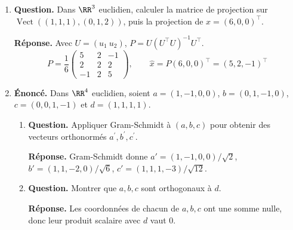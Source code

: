 \documentclass[12pt, a4paper]{article}
\begin{document}
\begin{enumerate}[label=8.\arabic*., start=70]
\begin{minipage}[t]{\linewidth}
\begin{enumerate}[\arabic*.]
  \item \textbf{Question.} Calculer la distance de $(6,0,0)^\top$ à l’espace colonne de $\begin{pmatrix}1&0\\0&1\\0&0\end{pmatrix}$, puis de $\begin{pmatrix}0&0\\1&0\\0&1\end{pmatrix}$.
\par\smallskip
\textbf{Réponse.} Pour $x=(6,0,0)^\top$, la distance au plan $z=0$ est $0$, et celle au plan $x=0$ est $6$.

\end{enumerate}
\end{minipage}

  \item \begin{minipage}[t]{\linewidth}\raggedright
\textbf{Question.} Dans $\RR^3$ euclidien, calculer la matrice de projection sur $\operatorname{Vect}((1,1,1),(0,1,2))$, puis la projection de $x=(6,0,0)^\top$.
\par\smallskip
\textbf{Réponse.} Avec $U=(u_1\ u_2)$, $P=U(U^\top U)^{-1}U^\top$.
    \[
      P=\frac16\begin{pmatrix}5&2&-1\\2&2&2\\-1&2&5\end{pmatrix},\qquad
      \widehat x=P(6,0,0)^\top=(5,2,-1)^\top
    \]
\end{minipage}

  \item \begin{minipage}[t]{\linewidth}\raggedright
\textbf{Énoncé.} Dans $\RR^4$ euclidien, soient $a=(1,-1,0,0)$, $b=(0,1,-1,0)$, $c=(0,0,1,-1)$ et $d=(1,1,1,1)$.

\begin{enumerate}[\arabic*.]
        \item \textbf{Question.} Appliquer Gram-Schmidt à $(a,b,c)$ pour obtenir des vecteurs orthonormés $a^{\prime},b^{\prime},c^{\prime}$.
\par\smallskip
\textbf{Réponse.} Gram-Schmidt donne
        $a'=(1,-1,0,0)/\sqrt2$, $b'=(1,1,-2,0)/\sqrt6$, $c'=(1,1,1,-3)/\sqrt{12}$.

  \item \textbf{Question.} Montrer que $a,b,c$ sont orthogonaux à $d$.
\par\smallskip
\textbf{Réponse.} Les coordonnées de chacun de $a,b,c$ ont une somme nulle, donc leur produit scalaire avec $d$ vaut $0$.


\end{enumerate}
\end{minipage}
\end{enumerate}
\end{document}
